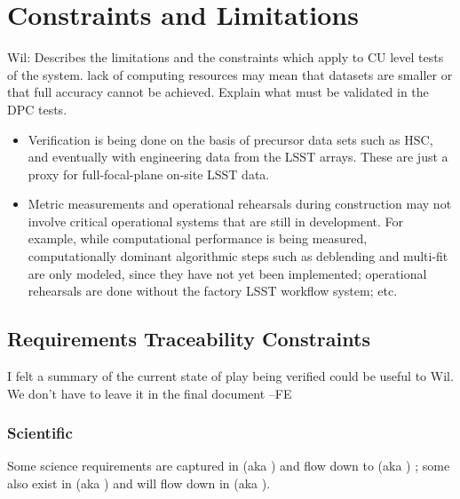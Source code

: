 \section{Constraints and Limitations}

\begin{note}
  Wil: Describes the limitations and the constraints which apply to CU level tests of the system. lack of computing resources may mean that datasets are smaller or that full accuracy cannot be achieved. Explain what must be validated in the DPC tests.
\end{note}

\begin{itemize}

\item Verification is being done on the basis of precursor data sets such as HSC, and eventually with engineering data from the LSST arrays. These are just a proxy for full-focal-plane on-site LSST data.

\item Metric measurements and operational rehearsals during construction may not involve critical operational systems that are still in development. For example, while computational performance is being measured, computationally dominant algorithmic steps such as deblending and multi-fit are only modeled, since they have not yet been implemented; operational rehearsals are done without the factory LSST workflow system; etc.

\end{itemize}

\subsection{Requirements Traceability Constraints}

\begin{note}
  I felt a summary of the current state of play being verified could be useful to Wil. We don't have to leave it in the final document --FE
\end{note}

\subsubsection{Scientific}

Some science requirements are captured in  (aka \LSR) and  flow down to  (aka \OSS) ; some also exist in  (aka \DPDD) and will flow down in  (aka \DMSR).

